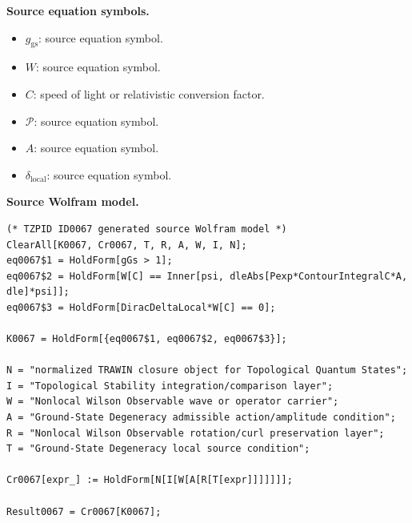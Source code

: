 \begin{minipage}[t]{0.49\linewidth}
\begingroup
\small
\raggedright
\textbf{Source equation symbols.}\par
\begin{itemize}[leftmargin=1.35em,itemsep=1pt,topsep=1pt,parsep=0pt]
    \item $g_{\mathrm{gs}}$: source equation symbol.
    \item $W$: source equation symbol.
    \item $C$: speed of light or relativistic conversion factor.
    \item $\mathcal{P}$: source equation symbol.
    \item $A$: source equation symbol.
    \item $\delta_{\mathrm{local}}$: source equation symbol.
\end{itemize}
\endgroup
\end{minipage}\hfill
\begin{minipage}[t]{0.47\linewidth}
\begingroup
\scriptsize
\raggedright
\textbf{Source Wolfram model.}\par
\begin{Verbatim}[fontsize=\tiny,breaklines=true,breakanywhere=true]
(* TZPID ID0067 generated source Wolfram model *)
ClearAll[K0067, Cr0067, T, R, A, W, I, N];
eq0067$1 = HoldForm[gGs > 1];
eq0067$2 = HoldForm[W[C] == Inner[psi, dleAbs[Pexp*ContourIntegralC*A, dle]*psi]];
eq0067$3 = HoldForm[DiracDeltaLocal*W[C] == 0];

K0067 = HoldForm[{eq0067$1, eq0067$2, eq0067$3}];

N = "normalized TRAWIN closure object for Topological Quantum States";
I = "Topological Stability integration/comparison layer";
W = "Nonlocal Wilson Observable wave or operator carrier";
A = "Ground-State Degeneracy admissible action/amplitude condition";
R = "Nonlocal Wilson Observable rotation/curl preservation layer";
T = "Ground-State Degeneracy local source condition";

Cr0067[expr_] := HoldForm[N[I[W[A[R[T[expr]]]]]]];

Result0067 = Cr0067[K0067];
\end{Verbatim}
\endgroup
\end{minipage}

